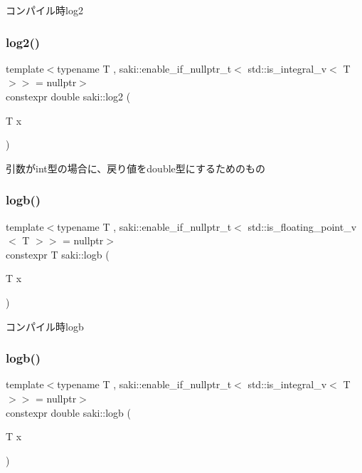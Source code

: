 コンパイル時log2 

\mbox{\label{namespacesaki_a8cb2f664389aab32abc797d9a60db4dc}} 
\subsubsection{\texorpdfstring{log2()}{log2()}\hspace{0.1cm}{\footnotesize\ttfamily [2/2]}}
{\footnotesize\ttfamily template$<$typename T , saki\+::enable\+\_\+if\+\_\+nullptr\+\_\+t$<$ std\+::is\+\_\+integral\+\_\+v$<$ T $>$$>$  = nullptr$>$ \\
constexpr double saki\+::log2 (\begin{DoxyParamCaption}\item[{T}]{x }\end{DoxyParamCaption})}



引数がint型の場合に、戻り値をdouble型にするためのもの 

\mbox{\label{namespacesaki_ab7e81af48b13fbf88f135d296471bac1}} 
\subsubsection{\texorpdfstring{logb()}{logb()}\hspace{0.1cm}{\footnotesize\ttfamily [1/2]}}
{\footnotesize\ttfamily template$<$typename T , saki\+::enable\+\_\+if\+\_\+nullptr\+\_\+t$<$ std\+::is\+\_\+floating\+\_\+point\+\_\+v$<$ T $>$$>$  = nullptr$>$ \\
constexpr T saki\+::logb (\begin{DoxyParamCaption}\item[{T}]{x }\end{DoxyParamCaption})}



コンパイル時logb 

\mbox{\label{namespacesaki_adf4ba562bb9897e98b75eb95027bfad5}} 
\subsubsection{\texorpdfstring{logb()}{logb()}\hspace{0.1cm}{\footnotesize\ttfamily [2/2]}}
{\footnotesize\ttfamily template$<$typename T , saki\+::enable\+\_\+if\+\_\+nullptr\+\_\+t$<$ std\+::is\+\_\+integral\+\_\+v$<$ T $>$$>$  = nullptr$>$ \\
constexpr double saki\+::logb (\begin{DoxyParamCaption}\item[{T}]{x }\end{DoxyParamCaption})}



